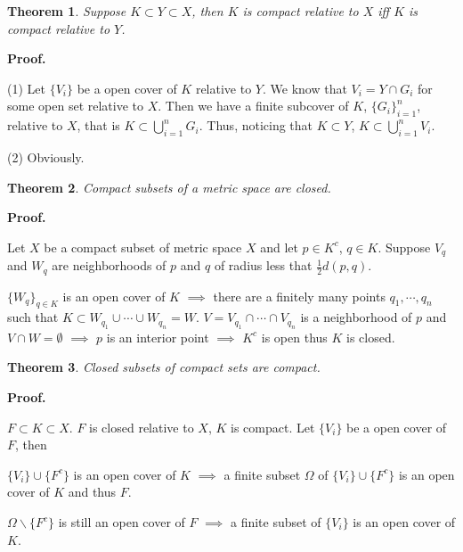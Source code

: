 \documentclass[aps,pra,onecolumn,notitlepage,superscriptaddress]{revtex4-1}
\newtheorem{theo}{Theorem}
\def\Proof{{\bf Proof.~}}
\begin{document}
    \begin{theo}
        Suppose $K \subset Y \subset X$, then $K$ is compact relative to $X$ iff $K$ is compact relative to $Y$.
    \end{theo}
    \begin{framed}
        \Proof {
            
        (1) Let $\{V_i\}$ be a open cover of $K$ relative to $Y$. We know that $V_i = Y \cap G_i$ for some open set relative to $X$. Then we have a finite subcover of $K$, $\{G_i\}_{i=1}^n$, relative to $X$, that is $K \subset \bigcup_{i=1}^n G_i$. Thus, noticing that $K \subset Y$, $K \subset \bigcup_{i=1}^n V_i$.
        
        (2) Obviously.
        }

    \end{framed}

    \begin{theo}
        Compact subsets of a metric space are closed.
    \end{theo}
    \begin{framed}
        \Proof {
            Let $X$ be a compact subset of metric space $X$ and let $p \in K^c$, $q \in K$. Suppose $V_q$ and $W_q$ are neighborhoods of $p$ and $q$ of radius less that $\frac{1}{2} d(p, q)$. 
            
            $\{W_q\}_{q \in K}$ is an open cover of $K$ $\implies$ there are a finitely many points $q_1, \cdots, q_n$ such that $K \subset W_{q_1} \cup \cdots \cup W_{q_n} = W$. $V = V_{q_1} \cap \cdots \cap V_{q_n}$ is a neighborhood of $p$ and $V \cap W = \emptyset$ $\implies$ $p$ is an interior point $\implies$ $K^c$ is open thus $K$ is closed.
        }
    \end{framed}

    \begin{theo}
        Closed subsets of compact sets are compact.
    \end{theo}
    \begin{framed}
        \Proof {
            $F \subset K \subset X$. $F$ is closed relative to $X$, $K$ is compact. Let $\{V_i\}$ be a open cover of $F$, then 
            
            $\{V_i\} \cup \{F^c\}$ is an open cover of $K$ $\implies$ a finite subset $\Omega$ of $\{V_i\} \cup \{F^c\}$ is an open cover of $K$ and thus $F$. 
            
            $\Omega \backslash \{F^c\}$ is still an open cover of $F$ $\implies$ a finite subset of $\{V_i\}$ is an open cover of $K$.

        }
    \end{framed}
\end{document}
